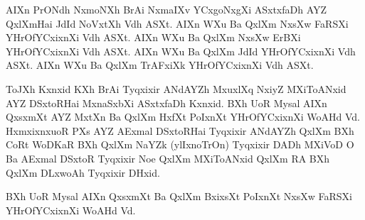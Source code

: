 \parindent=0pt
AIXn PrONdh NxmoNXh BrAi NxmaIXv YCxgoNxgXi ASxtxfaDh AYZ QxlXmHai JdId NoVxtXh Vdh
ASXt. {\FaRSXi AIXn WXu Ba QxlXm NxsXw FaRSXi YHrOfYCxixnXi Vdh ASXt.}
 {\ErBXi AIXn WXu Ba QxlXm NxsXw ErBXi YHrOfYCxixnXi Vdh ASXt.}
 {\JdId AIXn WXu Ba QxlXm JdId YHrOfYCxixnXi Vdh ASXt.}
 {\TrAFxiXk AIXn WXu Ba QxlXm TrAFxiXk YHrOfYCxixnXi Vdh ASXt.}

ToJXh Kxnxid KXh BrAi Tyqxixir ANdAYZh MxuxlXq NxiyZ MXiToANxid AYZ DSxtoRHai MxnaSxbXi ASxtxfaDh
Kxnxid. {\HxfXt BXh UoR Mysal AIXn QxsxmXt AYZ MxtXn Ba QxlXm HxfXt PoIxnXt YHrOfYCxixnXi WoAHd
Vd.} HxmxixnxuoR PXs AYZ AExmal DSxtoRHai 
Tyqxixir ANdAYZh QxlXm BXh CoRt WoDKaR BXh QxlXm NaYZk (ylIxnoTrOn)
Tyqxixir DADh MXiVoD O Ba AExmal DSxtoR Tyqxixir Noe QxlXm  MXiToANxid QxlXm RA BXh
QxlXm DLxwoAh Tyqxixir DHxid.  

{\BxixsXt\FaRSXi BXh UoR Mysal AIXn QxsxmXt Ba QxlXm
BxixsXt PoIxnXt NxsXw FaRSXi} YHrOfYCxixnXi WoAHd Vd.


